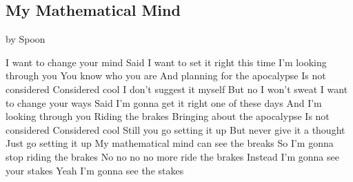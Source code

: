 \documentclass[numberinsequence]{krantz}
\begin{document}
\hypertarget{my-mathematical-mind}{%
\subsection{My Mathematical Mind}\label{my-mathematical-mind}}

by Spoon

I want to change your mind Said I want to set it right this time I'm
looking through you You know who you are And planning for the apocalypse
Is not considered Considered cool I don't suggest it myself But no I
won't sweat I want to change your ways Said I'm gonna get it right one
of these days And I'm looking through you Riding the brakes Bringing
about the apocalypse Is not considered Considered cool Still you go
setting it up But never give it a thought Just go setting it up My
mathematical mind can see the breaks So I'm gonna stop riding the brakes
No no no no more ride the brakes Instead I'm gonna see your stakes Yeah
I'm gonna see the stakes



\backmatter
\printindex
\end{document}
